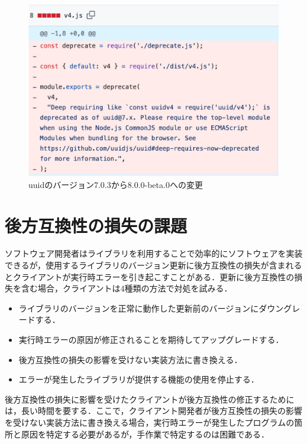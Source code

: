 \documentclass[11pt]{jreport}
\begin{document}
\begin{figure}[t]
\centerline{\includegraphics[width=0.75\linewidth]{@BSthesis2024_Iida/BSthesis2024_Iida_fig/uuid_library_code.pdf}}
\caption{uuidのバージョン7.0.3から8.0.0-beta.0への変更}
\label{fig:uuid_example}
\end{figure}

\section{後方互換性の損失の課題}
ソフトウェア開発者はライブラリを利用することで効率的にソフトウェアを実装できるが，使用するライブラリのバージョン更新に後方互換性の損失が含まれるとクライアントが実行時エラーを引き起こすことがある．更新に後方互換性の損失を含む場合，クライアントは4種類の方法で対処を試みる\cite{DependedOnYou}．

\begin{itemize}
\item ライブラリのバージョンを正常に動作した更新前のバージョンにダウングレードする．
\item 実行時エラーの原因が修正されることを期待してアップグレードする．
\item 後方互換性の損失の影響を受けない実装方法に書き換える．
\item エラーが発生したライブラリが提供する機能の使用を停止する．
\end{itemize}

後方互換性の損失に影響を受けたクライアントが後方互換性の修正するためには，長い時間を要する\cite{DependedOnYou}．ここで，クライアント開発者が後方互換性の損失の影響を受けない実装方法に書き換える場合，実行時エラーが発生したプログラムの箇所と原因を特定する必要があるが，手作業で特定するのは困難である\cite{Nielsen2021JSFix}\cite{10.1145/3428255}．
\end{document}
